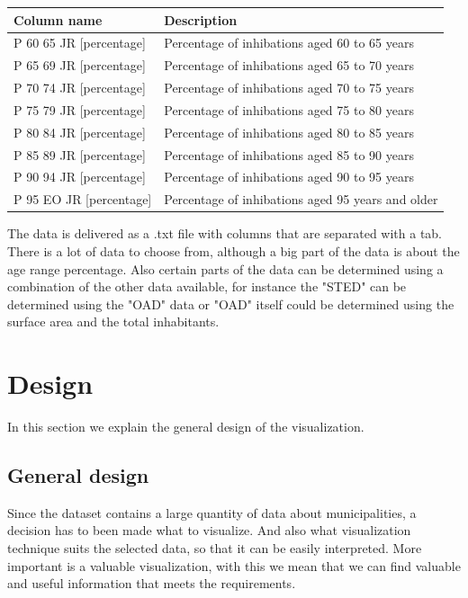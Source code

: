 \documentclass[a4paper,twoside,11pt]{article}
\begin{document}
\begin{center}
    \begin{tabular}{ | p{4.9cm} | p{10cm} |}
        \hline
        \textbf{Column name} & \textbf{Description} \\ \hline
        P 60 65 JR [percentage] & Percentage of inhibations aged 60 to 65 years \\ \hline
        P 65 69 JR [percentage] & Percentage of inhibations aged 65 to 70 years \\ \hline
        P 70 74 JR [percentage] & Percentage of inhibations aged 70 to 75 years \\ \hline
        P 75 79 JR [percentage] & Percentage of inhibations aged 75 to 80 years \\ \hline
        P 80 84 JR [percentage] & Percentage of inhibations aged 80 to 85 years \\ \hline
        P 85 89 JR [percentage] & Percentage of inhibations aged 85 to 90 years \\ \hline
        P 90 94 JR [percentage] & Percentage of inhibations aged 90 to 95 years \\ \hline
        P 95 EO JR [percentage] & Percentage of inhibations aged 95 years and older \\ \hline
    \end{tabular}
\end{center}
The data is delivered as a .txt file with columns that are separated with a tab. There is a lot of data to choose from, although a big part of the data is about the age range percentage. Also certain parts of the data can be determined using a combination of the other data available, for instance the "STED" can be determined using the "OAD" data or "OAD" itself could be determined using the surface area and the total inhabitants.
\newpage
\section{Design}
In this section we explain the general design of the visualization.
\subsection{General design}
Since the dataset contains a large quantity of data about municipalities, a decision has to been made what to visualize. And also what visualization technique suits the selected data, so that it can be easily interpreted. More important is a valuable visualization, with this we mean that we can find valuable and useful information that meets the requirements.
\end{document}
